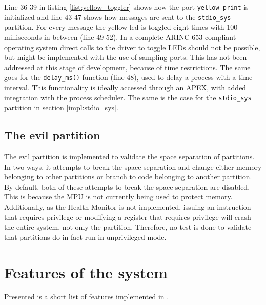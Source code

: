 Line 36-39 in listing \ref{list:yellow_toggler} shows how the port
\texttt{yellow\_print} is initialized and line 43-47 shows how messages are sent
to the \texttt{stdio\_sys} partition. For every message the yellow led is
toggled eight times with 100 milliseconds in between (line 49-52). In a complete
ARINC 653 compliant operating system direct calls to the driver to toggle LEDs
should not be possible, but might be implemented with the use of sampling ports.
This has not been addressed at this stage of development, because of time
restrictions. The same goes for the \texttt{delay\_ms()} function (line 48),
used to delay a process with a time interval. This functionality is ideally
accessed through an APEX, with added integration with the process scheduler.
The same is the case for the \texttt{stdio\_sys} partition in section
\ref{impl:stdio_sys}.


\subsection{The evil partition}
The evil partition is implemented to validate the space separation of partitions.
In two ways, it attempts to break the space separation and change either
memory belonging to other partitions or branch to code belonging to another
partition.\\
By default, both of these attempts to break the space separation are disabled.
This is because the MPU is not currently being used to protect memory.
Additionally, as the Health
Monitor is not implemented, issuing an instruction that requires privilege
or modifying a register that requires privilege will crash the entire system,
not only the partition. Therefore, no test is done to validate that partitions
do in fact run in unprivileged mode.


\section{Features of the system}
\label{impl:feature_list}
Presented is a short list of features implemented in \OSname{}.

